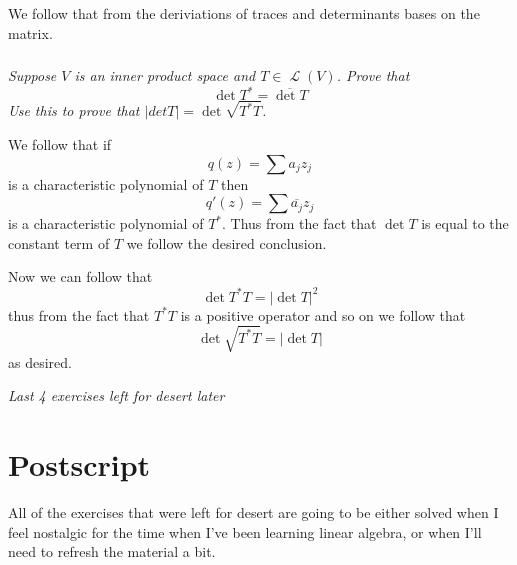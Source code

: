 \documentclass[11pt,oneside,titlepage]{book}
\DeclareMathOperator \map {\mathcal {L}}
\begin{document}
We follow that from the deriviations of traces and determinants bases on the matrix.

\subsection{}

\textit{Suppose $V$ is an inner product space and $T \in \map(V)$. Prove that
  $$\det T^* = \overline{\det T}$$
  Use this to prove that $|det T| = \det\sqrt{T^* T}$.}

We follow that if
$$q(z) = \sum{a_j z_j}$$
is a characteristic polynomial of $T$ then
$$q'(z) = \sum{\overline{a_j} z_j}$$
is a characteristic polynomial of $T^*$. Thus from the fact that $\det T$ is equal to the
constant term of $T$ we follow the desired conclusion.

Now we can follow that 
$$\det T^* T = |\det T|^2$$
thus from the fact that $T^* T$ is a positive operator and so on we follow that
$$\det \sqrt{T^* T} = |\det T|$$
as desired.

\textit{Last 4 exercises left for desert later}

\chapter*{Postscript}

All of the exercises that were left for desert are going to be either solved when
I feel nostalgic for the time when I've been learning linear algebra, or when
I'll need to refresh the material a bit.
\end{document}
